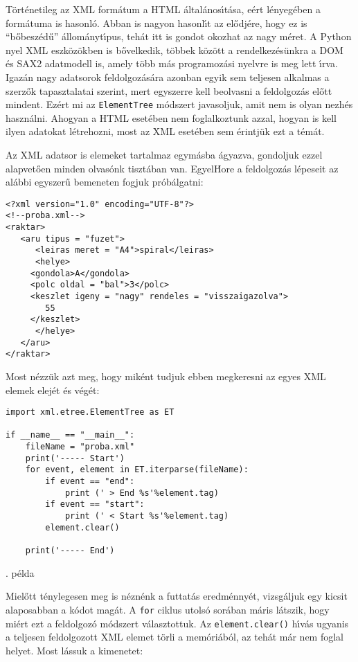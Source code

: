 T\"ort\'enetileg az XML form\'atum a HTML \'altal\'anos\'{\i}t\'asa, e\'ert l\'enyeg\'eben 
a form\'atuma is hasonl\'o. Abban is nagyon hasonl\'{\i}t az el\H{o}dj\'ere, hogy ez is 
``b\H{o}besz\'ed\H{u}'' \'allom\'anyt\'{\i}pus, teh\'at itt is gondot okozhat az nagy 
m\'eret. A Python nyel XML eszk\"oz\"okben is b\H{o}velkedik, t\"obbek k\"oz\"ott a 
rendelkez\'es\"unkra a DOM \'es SAX2 adatmodell is, amely t\"obb m\'as programoz\'asi 
nyelvre is meg lett \'{\i}rva. Igaz\'an nagy adatsorok feldolgoz\'as\'ara azonban egyik 
sem teljesen alkalmas a szerz\H{o}k tapasztalatai szerint, mert egyszerre kell beolvasni 
a feldolgoz\'as el\H{o}tt mindent. Ez\'ert mi az {\tt ElementTree} m\'odszert javasoljuk, 
amit nem is olyan nezh\'es haszn\'alni. Ahogyan a HTML eset\'eben nem foglalkoztunk azzal, 
hogyan is kell ilyen adatokat l\'etrehozni, most az XML eset\'eben sem \'erintj\"uk ezt a 
t\'em\'at. 

Az XML adatsor is elemeket tartalmaz egym\'asba \'agyazva, gondoljuk ezzel alapvet\H{o}en 
minden olvas\'onk tiszt\'aban van. Egyel\'H{o}re a feldolgoz\'as l\'epeseit az al\'abbi 
egyszer\H{u} bemeneten fogjuk pr\'ob\'algatni:

\begin{Verbatim}[fontsize=\small]
<?xml version="1.0" encoding="UTF-8"?>
<!--proba.xml-->
<raktar>
   <aru tipus = "fuzet">
      <leiras meret = "A4">spiral</leiras>
      <helye>
	 <gondola>A</gondola>
	 <polc oldal = "bal">3</polc>
	 <keszlet igeny = "nagy" rendeles = "visszaigazolva">
	    55
	 </keszlet>
      </helye>
   </aru>
</raktar>
\end{Verbatim}

\noindent Most n\'ezz\"uk azt meg, hogy mik\'ent tudjuk ebben megkeresni az egyes XML elemek 
elej\'et \'es v\'eg\'et:

\incminta
\begin{Verbatim}[fontsize=\small]
import xml.etree.ElementTree as ET

if __name__ == "__main__":
    fileName = "proba.xml"
    print('----- Start')
    for event, element in ET.iterparse(fileName):
        if event == "end":
            print (' > End %s'%element.tag)
        if event == "start":
            print (' < Start %s'%element.tag)
        element.clear()

    print('----- End')
\end{Verbatim}
\theminta. p\'elda

\noindent Miel\H{o}tt t\'enylegesen meg is n\'ezn\'enk a futtat\'as eredm\'enny\'et, 
vizsg\'aljuk egy kicsit alaposabban a k\'odot mag\'at. A {\tt for} ciklus utols\'o 
sor\'aban m\'aris l\'atszik, hogy mi\'ert ezt a feldolgoz\'o m\'odszert v\'alasztottuk. 
Az {\tt element.clear()} h\'{\i}v\'as ugyanis a teljesen feldolgozott XML elemet 
t\"orli a mem\'ori\'ab\'ol, az teh\'at m\'ar nem foglal helyet. Most l\'assuk a kimenetet:

